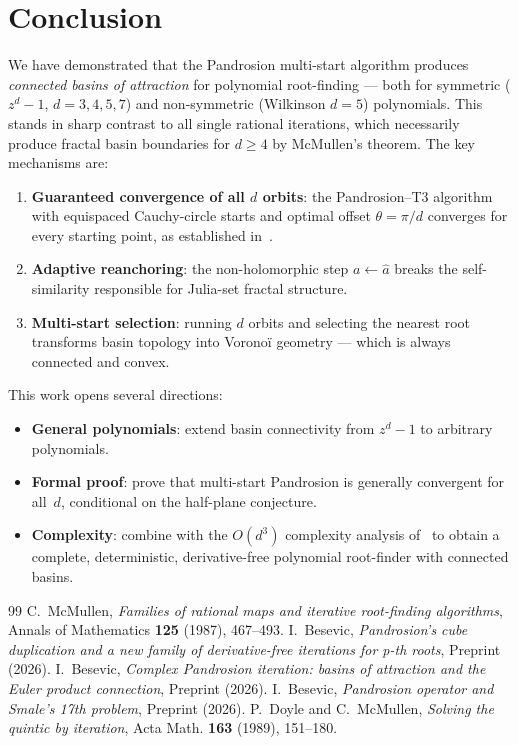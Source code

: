 \documentclass[11pt,a4paper]{article}
\theoremstyle{definition}
\theoremstyle{remark}
\begin{document}
\section{Conclusion}
\label{sec:conclusion}

We have demonstrated that the Pandrosion multi-start algorithm produces \emph{connected basins of attraction} for polynomial root-finding --- both for symmetric ($z^d - 1$, $d = 3, 4, 5, 7$) and non-symmetric (Wilkinson $d = 5$) polynomials.  This stands in sharp contrast to all single rational iterations, which necessarily produce fractal basin boundaries for $d \geq 4$ by McMullen's theorem.  The key mechanisms are:

\begin{enumerate}
\item \textbf{Guaranteed convergence of all $d$ orbits}: the Pandrosion--T3 algorithm with equispaced Cauchy-circle starts and optimal offset $\theta = \pi/d$ converges for every starting point, as established in~\cite{Besevic2026g}.
\item \textbf{Adaptive reanchoring}: the non-holomorphic step $a \leftarrow \hat{a}$ breaks the self-similarity responsible for Julia-set fractal structure.
\item \textbf{Multi-start selection}: running $d$ orbits and selecting the nearest root transforms basin topology into Vorono\"i geometry --- which is always connected and convex.
\end{enumerate}

This work opens several directions:
\begin{itemize}
\item \textbf{General polynomials}: extend basin connectivity from $z^d - 1$ to arbitrary polynomials.
\item \textbf{Formal proof}: prove that multi-start Pandrosion is generally convergent for all~$d$, conditional on the half-plane conjecture.
\item \textbf{Complexity}: combine with the $O(d^3)$ complexity analysis of~\cite{Besevic2026g} to obtain a complete, deterministic, derivative-free polynomial root-finder with connected basins.
\end{itemize}

\begin{thebibliography}{99}
 C.~McMullen, \emph{Families of rational maps and iterative root-finding algorithms}, Annals of Mathematics \textbf{125} (1987), 467--493.
 I.~Besevic, \emph{Pandrosion's cube duplication and a new family of derivative-free iterations for p-th roots}, Preprint (2026).
 I.~Besevic, \emph{Complex Pandrosion iteration: basins of attraction and the Euler product connection}, Preprint (2026).
 I.~Besevic, \emph{Pandrosion operator and Smale's 17th problem}, Preprint (2026).
 P.~Doyle and C.~McMullen, \emph{Solving the quintic by iteration}, Acta Math. \textbf{163} (1989), 151--180.
\end{thebibliography}
\end{document}
